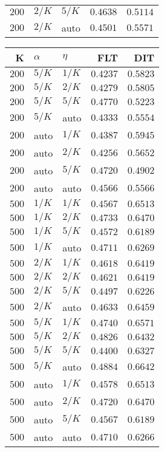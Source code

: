 \begin{table}
\begin{spacing}{1.2}
{\begin{tabular}{rll|rr}
$200$ &  $2/K$ &  $5/K$ &         $0.4638$ & $0.5114$ \\
$200$ &  $2/K$ &   auto &         $0.4501$ & $0.5571$ \\
\bottomrule
\end{tabular}
} \hfill \parbox{.45\linewidth}{\centering \begin{tabular}{rll|rr}
\toprule
    K &  $\alpha$ &    $\eta$ & FLT &        DIT \\
\midrule
$200$ &  $5/K$ &  $1/K$ &         $0.4237$ &      $0.5823$ \\
$200$ &  $5/K$ &  $2/K$ &         $0.4279$ &      $0.5805$ \\
$200$ &  $5/K$ &  $5/K$ &         $0.4770$ &      $0.5223$ \\
$200$ &  $5/K$ &   auto &         $0.4333$ &      $0.5554$ \\
$200$ &   auto &  $1/K$ &         $0.4387$ &      $0.5945$ \\
$200$ &   auto &  $2/K$ &         $0.4256$ &      $0.5652$ \\
$200$ &   auto &  $5/K$ &         $0.4720$ &      $0.4902$ \\
$200$ &   auto &   auto &         $0.4566$ &      $0.5566$ \\
\myrowcolor $500$ &  $1/K$ &  $1/K$ &         $0.4567$ &      $0.6513$ \\
$500$ &  $1/K$ &  $2/K$ &         $0.4733$ &      $0.6470$ \\
$500$ &  $1/K$ &  $5/K$ &         $0.4572$ &      $0.6189$ \\
$500$ &  $1/K$ &   auto &         $0.4711$ &      $0.6269$ \\
$500$ &  $2/K$ &  $1/K$ &         $0.4618$ &      $0.6419$ \\
$500$ &  $2/K$ &  $2/K$ &         $0.4621$ &      $0.6419$ \\
$500$ &  $2/K$ &  $5/K$ &         $0.4497$ &      $0.6226$ \\
$500$ &  $2/K$ &   auto &         $0.4633$ &      $0.6459$ \\
$500$ &  $5/K$ &  $1/K$ &         $0.4740$ &      $0.6571$ \\
$500$ &  $5/K$ &  $2/K$ &         $0.4826$ &      $0.6432$ \\
$500$ &  $5/K$ &  $5/K$ &         $0.4400$ &      $0.6327$ \\
$500$ &  $5/K$ &   auto &    $\bm{0.4884}$ & $\bm{0.6642}$ \\
$500$ &   auto &  $1/K$ &         $0.4578$ &      $0.6513$ \\
$500$ &   auto &  $2/K$ &         $0.4720$ &      $0.6470$ \\
$500$ &   auto &  $5/K$ &         $0.4567$ &      $0.6189$ \\
$500$ &   auto &   auto &         $0.4710$ &      $0.6266$ \\
\bottomrule
\end{tabular}
}
\end{spacing}
\end{table}
